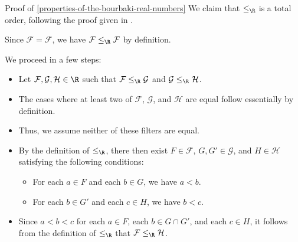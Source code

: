 \begin{Proof}{Proof of \cref{properties-of-the-bourbaki-real-numbers}}%
    We claim that $\leq_{\R}$ is a total order, following the proof given in \cite[Theorem 4.6]{weiss:the-reals-as-rational-cauchy-filters}.

    Since $\mathcal{F}=\mathcal{F}$, we have $\mathcal{F}\leq_{\R}\mathcal{F}$ by definition.

    We proceed in a few steps:
    \begin{itemize}
        \item Let $\mathcal{F},\mathcal{G},\mathcal{H}\in\R$ such that $\mathcal{F}\leq_{\R}\mathcal{G}$ and $\mathcal{G}\leq_{\R}\mathcal{H}$.
        \item The cases where at least two of $\mathcal{F}$, $\mathcal{G}$, and $\mathcal{H}$ are equal follow essentially by definition.
        \item Thus, we assume neither of these filters are equal.
        \item By the definition of $\leq_{\R}$, there then exist $F\in\mathcal{F}$, $G,G'\in\mathcal{G}$, and $H\in\mathcal{H}$ satisfying the following conditions:
            \begin{itemize}
                \item For each $a\in F$ and each $b\in G$, we have $a\lt b$.
                \item For each $b\in G'$ and each $c\in H$, we have $b\lt c$.
            \end{itemize}
        \item Since $a\lt b\lt c$ for each $a\in F$, each $b\in G\cap G'$, and each $c\in H$, it follows from the definition of $\leq_{\R}$ that $\mathcal{F}\leq_{\R}\mathcal{H}$.
    \end{itemize}


\end{Proof}
